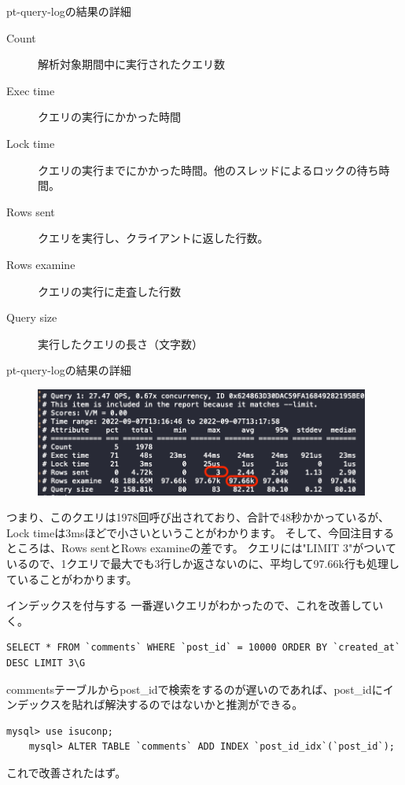 \documentclass{beamer}
\begin{document}
\begin{frame}{pt-query-logの結果の詳細}
  \begin{description}
    \item[Count] 解析対象期間中に実行されたクエリ数
    \item[Exec time] クエリの実行にかかった時間
    \item[Lock time] クエリの実行までにかかった時間。他のスレッドによるロックの待ち時間。
    \item[Rows sent] クエリを実行し、クライアントに返した行数。
    \item[Rows examine] クエリの実行に走査した行数
    \item[Query size] 実行したクエリの長さ（文字数）
  \end{description}
\end{frame}

\begin{frame}{pt-query-logの結果の詳細}
  \begin{figure}
    \centering
    \includegraphics[clip, keepaspectratio, width=110mm]{./fig/select_query_zoom.png}
  \end{figure}
  つまり、このクエリは1978回呼び出されており、合計で48秒かかっているが、Lock timeは3msほどで小さいということがわかります。
  そして、今回注目するところは、Rows sentとRows examineの差です。
  クエリには"LIMIT 3"がついているので、1クエリで最大でも3行しか返さないのに、平均して97.66k行も処理していることがわかります。
\end{frame}

\begin{frame}[fragile]{インデックスを付与する}
  一番遅いクエリがわかったので、これを改善していく。
  \begin{lstlisting}[basicstyle=\tiny]
    SELECT * FROM `comments` WHERE `post_id` = 10000 ORDER BY `created_at` DESC LIMIT 3\G
  \end{lstlisting}
  commentsテーブルからpost\_idで検索をするのが遅いのであれば、post\_idにインデックスを貼れば解決するのではないかと推測ができる。
  \begin{lstlisting}[basicstyle=\tiny]
    mysql> use isuconp;
    mysql> ALTER TABLE `comments` ADD INDEX `post_id_idx`(`post_id`);
  \end{lstlisting}
  これで改善されたはず。
\end{frame}
\end{document}
